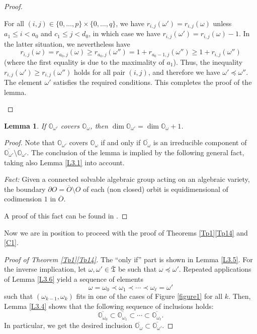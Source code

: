 \documentclass[11pt]{article}
\newtheorem{lemma}[theo]{Lemma}
\theoremstyle{definition}
\numberwithin{equation}{section}
\newcommand{\Xorbit}{\mathbb{O}}
\newcommand{\ppermutationsof}{\mathfrak{T}}
\newcommand{\parameters}{\overline{\ppermutationsof}}
\begin{document}
\begin{proof}
\begin{enumerate}[label=\textbf{Case \arabic*}]
For all $(i,j)\in\{0,\ldots,p\}\times\{0,\ldots,q\}$, we have $r_{i,j}(\omega')=r_{i,j}(\omega)$ unless $a_1\leq i<a_0$ and $c_1\leq j<d_0$, in which case we have $r_{i,j}(\omega')=r_{i,j}(\omega)-1$. In the latter situation, we nevertheless have
\[
r_{i,j}(\omega)=r_{a_0,j}(\omega)\geq r_{a_0,j}(\omega'')=1+r_{a_0-1,j}(\omega'')\geq 1+r_{i,j}(\omega'')
\]
(where the first equality is due to the maximality of $a_1$). Thus, the inequality $r_{i,j}(\omega')\geq r_{i,j}(\omega'')$ holds for all pair $(i,j)$, and therefore we have $\omega'\preceq\omega''$. The element $\omega'$ satisfies the required conditions. This completes the proof of the lemma.\qedhere
\end{enumerate}
\end{proof}

\begin{lemma}
\label{L3.7}
If $\Xorbit_{\omega'}$ covers $\Xorbit_\omega$, then $\dim\Xorbit_{\omega'}=\dim\Xorbit_\omega+1$.
\end{lemma}

\begin{proof}
Note that $\Xorbit_{\omega'}$ covers $\Xorbit_\omega$ if and only if $\overline{\Xorbit_\omega}$ is an irreducible component of $\overline{\Xorbit_{\omega'}}\setminus\Xorbit_{\omega'}$.
The conclusion of the lemma is implied by the following general fact, taking also Lemma \ref{L3.1} into account.

\smallskip
\noindent
{\it Fact:} Given a connected solvable algebraic group acting on an algebraic variety, the boundary $\partial O=\overline{O}\setminus O$ of each (non closed) orbit is equidimensional of codimension $1$ in $\overline{O}$.

\smallskip
\noindent
A proof of this fact can be found in \cite[Lemmas 2.12--2.13]{Timashev}.
\end{proof}

Now we are in position to proceed with the proof of Theorems \ref{Tp1}\ref{Tp14} and \ref{C1}.

\begin{proof}[Proof of Theorem \ref{Tp1}\ref{Tp14}] The ``only if'' part is shown in Lemma \ref{L3.5}. For the inverse implication, let $\omega,\omega'\in\parameters$ be such that $\omega\preceq\omega'$. Repeated applications of Lemma \ref{L3.6}
yield a sequence of elements
\[\omega=\omega_0\prec \omega_1\prec\cdots\prec \omega_\ell=\omega'\]
such that $(\omega_{k-1},\omega_k)$ fits in one of the cases of Figure \ref{figure1} for all $k$.
Then, Lemma \ref{L3.4} shows that the following sequence of inclusions holds:
\[\overline{\Xorbit_{\omega_0}}\subset \overline{\Xorbit_{\omega_1}}\subset\cdots\subset \overline{\Xorbit_{\omega_\ell}}.\]
In particular, we get the desired inclusion $\overline{\Xorbit_\omega}\subset\overline{\Xorbit_{\omega'}}$.
\end{proof}
\end{document}
